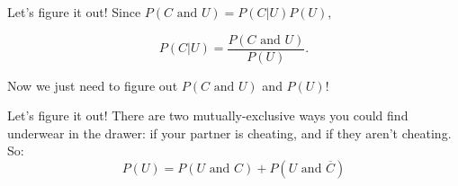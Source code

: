 \documentclass{beamer}\usepackage[]{graphicx}\usepackage[]{color}
\begin{document}
\begin{darkframes}
\begin{frame}{Let's figure it out!}
  Since $P(\text{$C$ and $U$}) = P(C|U)P(U)$,

  \[ P(C|U) = \frac{P(\text{$C$ and $U$})}{P(U)}. \]

  \pause

  Now we just need to figure out $P(\text{$C$ and $U$})$ and $P(U)$!
\end{frame}

\begin{frame}{Let's figure it out!}
  There are two mutually-exclusive ways you could find underwear in the drawer: if your partner is cheating, and if they aren't cheating. \pause  So:
  \[
    P(U) = P(\text{$U$ and $C$}) + P(\text{$U$ and $\overline{C}$})
  \]
\end{frame}

\end{darkframes}
\end{document}
